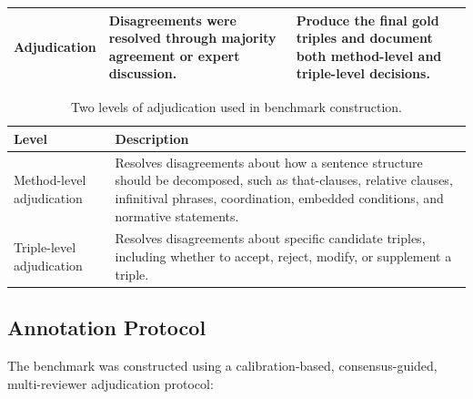 \documentclass[conference]{IEEEtran}
\begin{document}
\begin{table}[t]
\begin{tabularx}{\textwidth}{
        >{\raggedright\arraybackslash}p{}
        >{\raggedright\arraybackslash}p{}
        >{\raggedright\arraybackslash}X
    }
        \midrule

        Adjudication &
        Disagreements were resolved through majority agreement or expert discussion. &
        Produce the final gold triples and document both method-level and triple-level
        decisions. \\

        \bottomrule
    \end{tabularx}
\end{table}

\begin{table}[t]
    \centering
    \caption{Two levels of adjudication used in benchmark construction.}
    \label{tab:two-level-adjudication}
    \small
    \renewcommand{\arraystretch}{1.15}

    \begin{tabularx}{\columnwidth}{
        >{\raggedright\arraybackslash}p{}
        >{\raggedright\arraybackslash}X
    }
        \toprule
        \textbf{Level} &
        \textbf{Description} \\
        \midrule

        Method-level adjudication &
        Resolves disagreements about how a sentence structure should be decomposed,
        such as that-clauses, relative clauses, infinitival phrases, coordination,
        embedded conditions, and normative statements. \\

        \midrule

        Triple-level adjudication &
        Resolves disagreements about specific candidate triples, including whether
        to accept, reject, modify, or supplement a triple. \\

        \bottomrule
    \end{tabularx}
\end{table}


\subsection{Annotation Protocol}

The benchmark was constructed using a calibration-based, consensus-guided,
multi-reviewer adjudication protocol:
\end{document}

